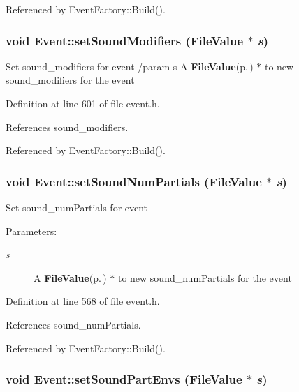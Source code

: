 Referenced by Event\-Factory::Build().
\subsubsection{\setlength{\rightskip}{0pt plus 5cm}void Event::set\-Sound\-Modifiers ({\bf File\-Value} $\ast$ {\em s})\hspace{0.3cm}{\tt  [inline]}}\label{classEvent_a71}


Set sound\_\-modifiers for event /param s A {\bf File\-Value}{\rm (p.\,\pageref{classFileValue})} $\ast$ to new sound\_\-modifiers for the event 

Definition at line 601 of file event.h.

References sound\_\-modifiers.

Referenced by Event\-Factory::Build().
\subsubsection{\setlength{\rightskip}{0pt plus 5cm}void Event::set\-Sound\-Num\-Partials ({\bf File\-Value} $\ast$ {\em s})\hspace{0.3cm}{\tt  [inline]}}\label{classEvent_a65}


Set sound\_\-num\-Partials for event \begin{Desc}
\item[Parameters:]
\begin{description}
\item[{\em s}]A {\bf File\-Value}{\rm (p.\,\pageref{classFileValue})} $\ast$ to new sound\_\-num\-Partials for the event \end{description}
\end{Desc}


Definition at line 568 of file event.h.

References sound\_\-num\-Partials.

Referenced by Event\-Factory::Build().
\subsubsection{\setlength{\rightskip}{0pt plus 5cm}void Event::set\-Sound\-Part\-Envs ({\bf File\-Value} $\ast$ {\em s})\hspace{0.3cm}{\tt  [inline]}}\label{classEvent_a69}


